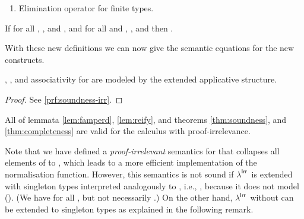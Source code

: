 \documentclass{LMCS}
\newcommand{\lambdaPI}{\texorpdfstring{\ensuremath{\lambda^{\mathsf{Irr}}}}{Proof-irrelevance}}
\newcommand{\lambdaIrr}{\lambdaPI}
\newcommand{\ruleref}[1]{(\RefTirName{#1})}
\newcommand{\LONGVERSION}[1]{}
\newcommand{\SHORTVERSION}[1]{#1}
\newcommand{\LONGSHORT}[2]{\LONGVERSION{#1}\SHORTVERSION{#2}}
\begin{document}
{\begin{defi}[Eliminations on ]
\begin{enumerate}[(1)]
  \item Elimination operator for finite types.
  
\end{enumerate}
\end{defi}

\begin{rem}
  If for all , , and , and for all  and , , and  then .
\end{rem}


With these new definitions we can now give the semantic equations for
the new constructs. 

\begin{defi}
  
  
\end{defi}


\begin{lem}
  \label{lem:soundness-irr} , , and
  associativity for  are modeled by the extended
  applicative structure.
\end{lem}
\begin{proof}See \ref{prf:soundness-irr}.
\end{proof}
}


\begin{rem}
\LONGSHORT{
 All of lemmata \ref{lem:famperd}, \ref{lem:reify}, and theorems
  \ref{thm:soundness}, and \ref{thm:completeness} are valid for the
  extended calculus.
}{
  All of lemmata \ref{lem:famperd}, \ref{lem:reify}, and theorems
  \ref{thm:soundness}, and \ref{thm:completeness} are valid for the
  calculus with proof-irrelevance.
}
\end{rem}

Note that we have defined a \emph{proof-irrelevant}
semantics for  that collapses
all elements of  to , which leads to a more efficient
implementation of the normalisation function. However, this semantics
is not sound if \lambdaIrr\ is extended with singleton types
interpreted analogously to , i.e., , because it does not model
\ruleref{sing-eq-el}.  (We have  for all
, but not necessarily .)
On the other hand, \lambdaIrr\ without 
can be extended to singleton types as explained in the following
remark.
\end{document}
